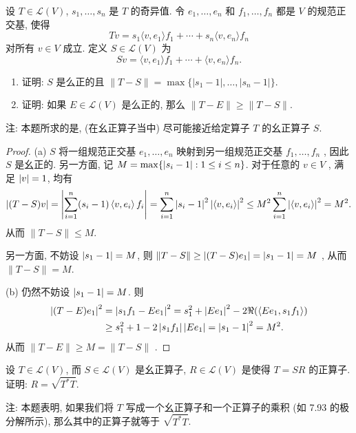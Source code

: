 \documentclass{article}
\begin{document}
\begin{problem}[7F-27]
设 $T \in \mathcal{L}(V)$, $s_1, \ldots, s_n$ 是 $T$ 的奇异值. 令 $e_1, \ldots, e_n$ 和 $f_1, \ldots, f_n$ 都是 $V$ 的规范正交基, 使得
\[
T v = s_1 \langle v, e_1 \rangle f_1 + \cdots + s_n \langle v, e_n \rangle f_n
\]
对所有 $v \in V$ 成立. 定义 $S \in \mathcal{L}(V)$ 为
\[
S v = \langle v, e_1 \rangle f_1 + \cdots + \langle v, e_n \rangle f_n.
\]
\begin{enumerate}[label=(\alph*)]
\item 证明: $S$ 是么正的且 $\|T - S\| = \max\{ |s_1 - 1|, \ldots, |s_n - 1| \}$.
\item 证明: 如果 $E \in \mathcal{L}(V)$ 是么正的, 那么 $\|T - E\| \ge \|T - S\|$.
\end{enumerate}

注: 本题所求的是, (在幺正算子当中) 尽可能接近给定算子 $T$ 的幺正算子 $S$.
\end{problem}

\begin{proof}
  (a) \( S \) 将一组规范正交基 \( e_1,\dots,e_n \) 映射到另一组规范正交基 \( f_1,\dots,f_n \) , 因此 \( S \) 是幺正的. 另一方面, 记 \( M=\max\{\left|s_i-1\right|:1\le i\le n\} \). 对于任意的 \( v\in V \) , 满足 \( \left|v\right|=1 \), 均有
  \[ \left|(T-S)v\right|= \left|\sum_{i=1}^{n}(s_i-1) \left\langle v, e_i \right\rangle f_i\right|=\sum_{i=1}^{n}\left|s_i-1\right|^2\left|\left\langle v, e_i \right\rangle\right|^2\le M^2 \sum_{i=1}^{n}\left|\left\langle v, e_i \right\rangle\right|^2=M^2. \]
  从而 \( \|T-S\|\le M \). 
  
  另一方面, 不妨设 \( \left|s_1-1\right|=M \), 则 \( \|T-S\|\ge \left|(T-S)e_1\right|=\left|s_1-1\right|=M \) , 从而 \( \|T-S\|=M \).

  (b) 仍然不妨设 \( \left|s_1-1\right|=M \). 则
  \begin{align*}
    \left|(T-E)e_1\right|^2 
    &= \left|s_1f_1-Ee_1\right|^2
    = s_1^2+\left|Ee_1\right|^2-2\Re(\left\langle Ee_1, s_1f_1 \right\rangle) \\
    &\ge s_1^2+1-2\left|s_1f_1\right|\left|Ee_1\right|
    =\left|s_1-1\right|^2=M^2.
  \end{align*}
  从而 \( \|T-E\|\ge M=\|T-S\| \) .
\end{proof}



\begin{problem}[7F-30]
设 $T \in \mathcal{L}(V)$, 而 $S \in \mathcal{L}(V)$ 是幺正算子, $R \in \mathcal{L}(V)$ 是使得 $T = S R$ 的正算子. 证明: $R = \sqrt{T^* T}$.

注: 本题表明, 如果我们将 $T$ 写成一个幺正算子和一个正算子的乘积 (如 7.93 的极分解所示), 那么其中的正算子就等于 $\sqrt{T^* T}$.
\end{problem}
\end{document}
